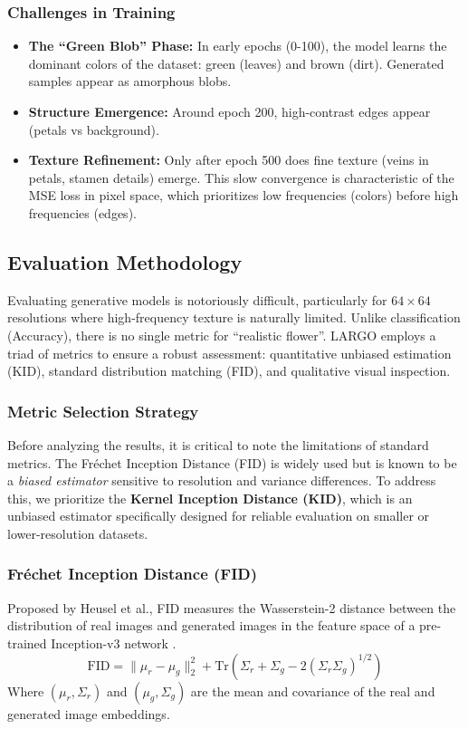 \documentclass[12pt, a4paper]{article}
\begin{document}
\subsubsection{Challenges in Training}
\begin{itemize}
    \item \textbf{The ``Green Blob'' Phase:} In early epochs (0-100), the model learns the dominant colors of the dataset: green (leaves) and brown (dirt). Generated samples appear as amorphous blobs.
    \item \textbf{Structure Emergence:} Around epoch 200, high-contrast edges appear (petals vs background).
    \item \textbf{Texture Refinement:} Only after epoch 500 does fine texture (veins in petals, stamen details) emerge. This slow convergence is characteristic of the MSE loss in pixel space, which prioritizes low frequencies (colors) before high frequencies (edges).
\end{itemize}
\subsection{Evaluation Methodology}

Evaluating generative models is notoriously difficult, particularly for $64 \times 64$ resolutions where high-frequency texture is naturally limited. Unlike classification (Accuracy), there is no single metric for ``realistic flower''. LARGO employs a triad of metrics to ensure a robust assessment: quantitative unbiased estimation (KID), standard distribution matching (FID), and qualitative visual inspection.

\subsubsection{Metric Selection Strategy}
Before analyzing the results, it is critical to note the limitations of standard metrics. The Fréchet Inception Distance (FID) is widely used but is known to be a \textit{biased estimator} sensitive to resolution and variance differences. To address this, we prioritize the \textbf{Kernel Inception Distance (KID)}, which is an unbiased estimator specifically designed for reliable evaluation on smaller or lower-resolution datasets.

\subsubsection{Fréchet Inception Distance (FID)}
Proposed by Heusel et al., FID measures the Wasserstein-2 distance between the distribution of real images and generated images in the feature space of a pre-trained Inception-v3 network \cite{heusel2017fid}.
\begin{equation}
    \text{FID} = \|\mu_r - \mu_g\|_2^2 + \text{Tr}(\Sigma_r + \Sigma_g - 2(\Sigma_r \Sigma_g)^{1/2})
\end{equation}
Where $(\mu_r, \Sigma_r)$ and $(\mu_g, \Sigma_g)$ are the mean and covariance of the real and generated image embeddings.
\end{document}
